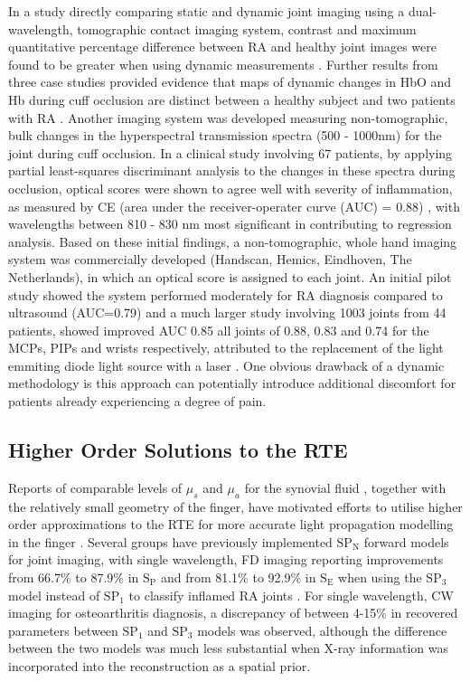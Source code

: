 \documentclass[twoside]{bhamthesis}
\theoremstyle{definition}
\begin{document}
In a study directly comparing static and dynamic joint imaging using a dual-wavelength, tomographic contact imaging system, contrast and maximum quantitative percentage difference between RA and healthy joint images were found to be greater when using dynamic measurements \cite{lasker2006comparison}. Further results from three case studies provided evidence that maps of dynamic changes in HbO and Hb during cuff occlusion are distinct between a healthy subject and two patients with RA \cite{lasker2007dynamic}. Another imaging system was developed measuring non-tomographic, bulk changes in the hyperspectral transmission spectra (500 - 1000nm) for the joint during cuff occlusion. In a clinical study involving 67 patients, by applying partial least-squares discriminant analysis to the changes in these spectra during occlusion, optical scores were shown to agree well with severity of inflammation, as measured by CE (area under the receiver-operater curve (AUC) = 0.88) \cite{meier2012potential}, with wavelengths between 810 - 830 nm most significant in contributing to regression analysis. Based on these initial findings, a non-tomographic, whole hand imaging system was commercially developed (Handscan, Hemics, Eindhoven, The Netherlands), in which an optical score is assigned to each joint. An initial pilot study showed the system performed moderately for RA diagnosis compared to ultrasound (AUC=0.79) \cite{van2016assessment} and a much larger study involving 1003 joints from 44 patients, showed improved AUC 0.85 all joints of 0.88, 0.83 and 0.74 for the MCPs, PIPs and wrists respectively, attributed to the replacement of the light emmiting diode light source with a laser \cite{besselink2018optical}. One obvious drawback of a dynamic methodology is  this approach can potentially introduce additional discomfort for patients already experiencing a degree of pain.

\subsection{Higher Order Solutions to the RTE}
\label{Higher Order Solutions to the RTE}

Reports of comparable levels of $\mu_s$ and $\mu_a$ for the synovial fluid \cite{prapavat1995evaluation}, together with the relatively small geometry of the finger, have motivated efforts to utilise higher order approximations to the RTE for more accurate light propagation modelling in the finger \cite{yuan2009comparison,montejo2014computational}. Several groups have previously implemented $\mathrm{SP_N}$ forward models for joint imaging, with single wavelength, FD imaging reporting improvements from 66.7\% to 87.9\% in $\mathrm{S_P}$ and from 81.1\% to 92.9\% in $\mathrm{S_E}$ when using the $\mathrm{SP_3}$ model instead of $\mathrm{SP_1}$ to classify inflamed RA joints \cite{montejo2014computational}. For single wavelength, CW imaging for osteoarthritis diagnosis, a discrepancy of between 4-15\% in recovered parameters between $\mathrm{SP_1}$ and $\mathrm{SP_3}$ models \cite{yuan2009comparison} was observed, although the difference between the two models was much less substantial when X-ray information was incorporated into the reconstruction as a spatial prior. 
\end{document}
